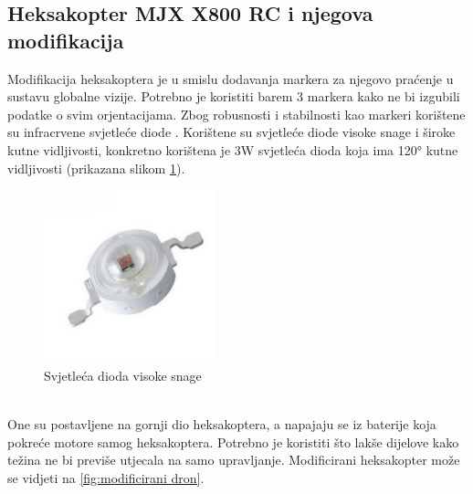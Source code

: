 \documentclass[times, utf8, diplomski]{fer}
\begin{document}
\subsection{Heksakopter MJX X800 RC i njegova modifikacija}\label{sec:heksakopter}
Modifikacija heksakoptera je u smislu dodavanja markera za njegovo praćenje u sustavu globalne vizije. Potrebno je koristiti barem 3 markera kako ne bi izgubili podatke o svim orjentacijama. Zbog robusnosti i stabilnosti kao markeri korištene su infracrvene  svjetleće diode . Korištene su svjetleće diode visoke snage i široke kutne vidljivosti, konkretno korištena je 3W svjetleća dioda koja ima \ang{120} kutne vidljivosti (prikazana slikom \ref{fig:LED}). \\
\begin{figure}[htb]
\centering
\includegraphics[width=5cm]{img/LED.png}
\caption{Svjetleća dioda visoke snage\protect\footnotemark}
\label{fig:LED}
\end{figure}\\
One su postavljene na gornji dio heksakoptera, a napajaju se iz baterije koja pokreće motore samog heksakoptera. Potrebno je koristiti što lakše dijelove kako težina ne bi previše utjecala na samo upravljanje. Modificirani heksakopter može se vidjeti na \ref{fig:modificirani dron}.
\end{document}
